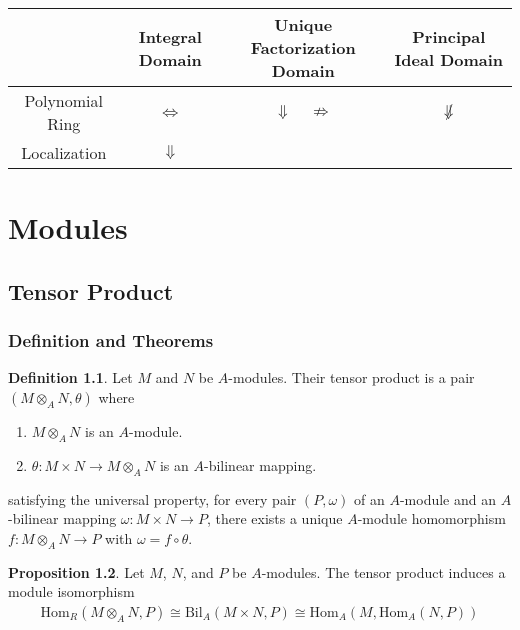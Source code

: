 \documentclass[a4paper]{book}
\theoremstyle{definition}
\newtheorem{definition}{Definition}[]
\newtheorem{proposition}[definition]{Proposition}
\begin{document}
\begin{center}
    \begin{tabular}{ | c | c | c | c | }
        \hline
        & Integral Domain & Unique Factorization Domain & Principal Ideal Domain \\
        \hline
        Polynomial Ring & \(\iff\) & \(\Downarrow \quad \not\Rightarrow\) & \(\not\Downarrow\) \\
        \hline
        Localization & \(\Downarrow\) & &
    \end{tabular}
\end{center}

\part{Modules}

\chapter{Tensor Product}
\section{Definition and Theorems}

\begin{defbox}
    \begin{definition}
        Let \(M\) and \(N\) be \(A\)-modules. Their tensor product is a pair \((M \otimes_A N, \theta)\) where
        \begin{enumerate}
            \item \(M \otimes_A N\) is an \(A\)-module.
            \item \(\theta: M \times N \rightarrow M \otimes_A N\) is an \(A\)-bilinear mapping.
        \end{enumerate}
        satisfying the universal property, for every pair \((P, \omega)\) of an \(A\)-module and an \(A\)-bilinear mapping \(\omega: M \times N \rightarrow P\), there exists a unique \(A\)-module homomorphism \(f: M \otimes_A N \rightarrow P\) with \(\omega = f \circ \theta\).
    \end{definition}
\end{defbox}
\begin{thmbox}
    \begin{proposition}
        Let \(M\), \(N\), and \(P\) be \(A\)-modules. The tensor product induces a module isomorphism
        \begin{align*}
            \mathrm{Hom}_R(M \otimes_A N, P) \cong \mathrm{Bil}_A(M \times N, P) \cong \mathrm{Hom}_A(M, \mathrm{Hom}_A(N, P))
        \end{align*}
    \end{proposition}
\end{thmbox}
\end{document}
